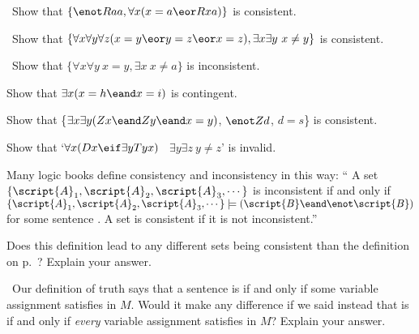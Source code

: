 \problempart
\label{pr.IdentityModels}
\begin{earg}
\item\leftsolutions\ Show that $\{{\enot}Raa, \forall x (x=a \eor Rxa)\}$
is consistent.
\item\leftsolutions\ Show that $\{\forall x\forall y\forall z(x=y \eor y=z \eor x=z),
\exists x\exists y\ x\neq y\}$ is consistent.
\item\leftsolutions\ Show that $\{\forall x\forall y\ x=y, \exists x\ x \neq a\}$ is inconsistent.
\item Show that $\exists x (x = h \eand x = i)$ is contingent.
\item Show that \{$\exists x\exists y(Zx \eand Zy \eand x=y)$, $\enot Zd$, $d=s$\} is consistent.
\item Show that `$\forall x(Dx \eif \exists y Tyx)$ \therefore\ $\exists y \exists z\ y\neq z$' is invalid.
\end{earg}




\problempart
\label{pr.SemanticsEssay}
\begin{earg}
\item Many logic books define consistency and inconsistency in this way:
`` A set $\{\script{A}_1,\script{A}_2,\script{A}_3,\cdots\}$ is inconsistent if and only if $\{\script{A}_1,\script{A}_2,\script{A}_3,\cdots\}\models(\script{B}\eand\enot\script{B})$ for some sentence . A set is consistent if it is not inconsistent.''

Does this definition lead to any different sets being consistent than the definition on  p.~\pageref{def.consistencySL}? Explain your answer.

\item\leftsolutions\ Our definition of truth says that a sentence  is   if and only if some variable assignment satisfies  in $M$. Would it make any difference if we said instead that  is   if and only if \emph{every} variable assignment satisfies  in $M$? Explain your answer.
\end{earg}

